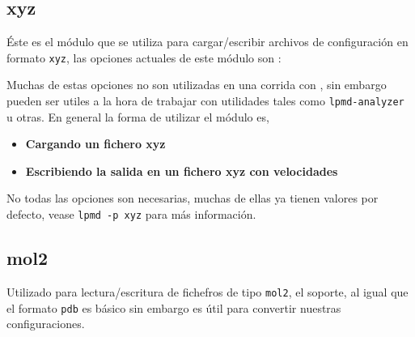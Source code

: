 \subsection{xyz}
\'Este es el m\'odulo que se utiliza para cargar/escribir archivos de configuraci\'on en formato \verb|xyz|, las opciones actuales de este m\'odulo son :


Muchas de estas opciones no son utilizadas en una corrida con {\lpmd}, sin embargo pueden ser utiles a la hora de trabajar con utilidades tales como \verb|lpmd-analyzer| u otras. En general la forma de utilizar el m\'odulo es,

\begin{itemize}
 \item \textbf{Cargando un fichero xyz}
 \item \textbf{Escribiendo la salida en un fichero xyz con velocidades}
\end{itemize}

No todas las opciones son necesarias, muchas de ellas ya tienen valores por defecto, vease \verb|lpmd -p xyz| para m\'as informaci\'on.

\subsection{mol2}
Utilizado para lectura/escritura de fichefros de tipo \verb|mol2|, el soporte, al igual que el formato \verb|pdb| es b\'asico sin embargo es \'util para convertir nuestras configuraciones.


